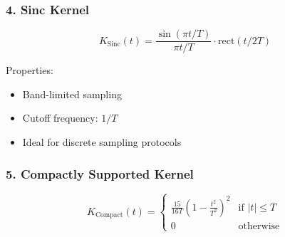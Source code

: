 \subsubsection{4. Sinc Kernel}
\begin{equation}
K_{\text{Sinc}}(t) = \frac{\sin(\pi t/T)}{\pi t/T} \cdot \text{rect}(t/2T)
\end{equation}

Properties:
\begin{itemize}
\item Band-limited sampling
\item Cutoff frequency: $1/T$
\item Ideal for discrete sampling protocols
\end{itemize}

\subsubsection{5. Compactly Supported Kernel}
\begin{equation}
K_{\text{Compact}}(t) = \begin{cases}
\frac{15}{16T}\left(1 - \frac{t^2}{T^2}\right)^2 & \text{if } |t| \leq T \\
0 & \text{otherwise}
\end{cases}
\end{equation}

